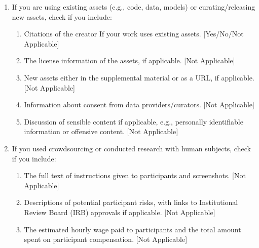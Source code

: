 \documentclass[twoside]{article}
\begin{document}
\begin{enumerate}
  \item If you are using existing assets (e.g., code, data, models) or curating/releasing new assets, check if you include:
  \begin{enumerate}
    \item Citations of the creator If your work uses existing assets. [Yes/No/Not Applicable]
    \item The license information of the assets, if applicable. [Not Applicable]
    \item New assets either in the supplemental material or as a URL, if applicable. [Not Applicable]
    \item Information about consent from data providers/curators. [Not Applicable]
    \item Discussion of sensible content if applicable, e.g., personally identifiable information or offensive content. [Not Applicable]
  \end{enumerate}

  \item If you used crowdsourcing or conducted research with human subjects, check if you include:
  \begin{enumerate}
    \item The full text of instructions given to participants and screenshots. [Not Applicable]
    \item Descriptions of potential participant risks, with links to Institutional Review Board (IRB) approvals if applicable. [Not Applicable]
    \item The estimated hourly wage paid to participants and the total amount spent on participant compensation. [Not Applicable]
  \end{enumerate}

\end{enumerate}



\clearpage
\appendix
\thispagestyle{empty}

\onecolumn




\end{document}
